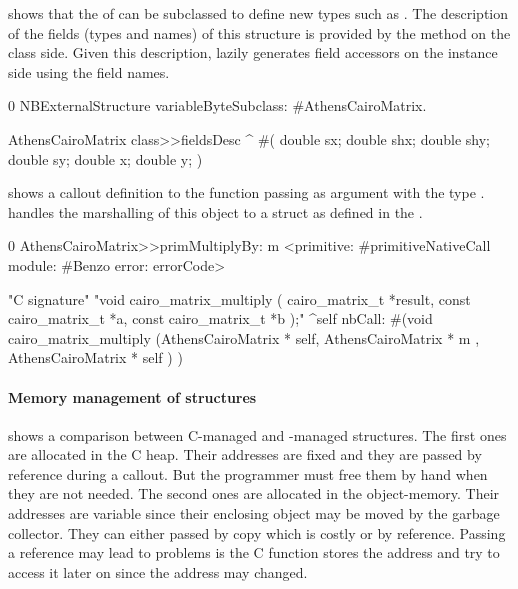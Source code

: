 \noindent {} shows that the  of \NBFFI can be subclassed to define new types such as .
The description of the fields (types and names) of this structure is provided by the  method on the class side.
Given this description, \NB lazily generates field accessors on the instance side using the field names.

\begin{numstcode}[
	label={lst:ffi-AthensCairoMatrix},
	caption={Example of \NBFFI definition of an \ttt{ExternalStructure}}]{0}
NBExternalStructure
    variableByteSubclass: #AthensCairoMatrix.

AthensCairoMatrix class>>fieldsDesc
	^ #(  double sx; double shx;
		  double shy; double sy;
		  double x; double y;  )
\end{numstcode}

\noindent {} shows a callout definition to the
  function passing  as argument with the type .
\NB handles the marshalling of this object to a struct as defined in the .

\begin{numstcode}[
	label={lst:ffi-cairoCallouts},
	caption={Example of callouts using \ttt{cairo\_matrix\_t}}]{0}
AthensCairoMatrix>>primMultiplyBy: m
	<primitive: #primitiveNativeCall
	 module: #Benzo
     error: errorCode>

"C signature"
"void cairo_matrix_multiply (
                     cairo_matrix_t *result,
                     const cairo_matrix_t *a,
                     const cairo_matrix_t *b );"
	^self nbCall: #(void   cairo_matrix_multiply
		(AthensCairoMatrix * self,
		AthensCairoMatrix * m ,
		AthensCairoMatrix * self ) )
\end{numstcode}


\paragraph{Memory management of structures}
 shows a comparison between C-managed and \PH-managed structures.
The first ones are allocated in the C heap.
Their addresses are fixed and they are passed by reference during a callout.
But the programmer must free them by hand when they are not needed.
The second ones are allocated in the \PH object-memory.
Their addresses are variable since their enclosing object may be moved by the garbage collector.
They can either passed by copy which is costly or by reference.
Passing a reference may lead to problems is the C function stores the address and try to access it later on since the address may changed.


